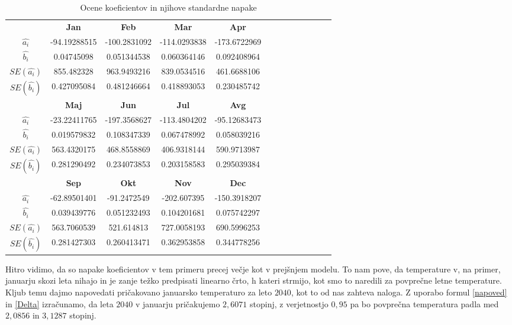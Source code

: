 \documentclass{article}
\begin{document}
\begin{table}[H]
    \centering
    \begin{tabular}{c c c c c c c c c c c c c}
        &	\bf{Jan}  &  \bf{Feb}  &  \bf{Mar}  &  \bf{Apr}   \\
        $\hat{a_i}$       &  -94.19288515  &	-100.2831092  &	-114.0293838  &	-173.6722969   \\
        $\hat{b_i}$       &  0.04745098	&  0.051344538  &	0.060364146  &	0.092408964   \\
        $SE (\hat{a_i})$  &  855.482328  &	963.9493216  &	839.0534516  & 	461.6688106    \\
        $SE (\hat{b_i})$  &  0.427095084  &	0.481246664  & 	0.418893053  &	0.230485742    \\
        &  \bf{Maj}  & \bf{Jun}  &  \bf{Jul}  &  \bf{Avg}   \\
        $\hat{a_i}$       &  -23.22411765  & 	-197.3568627  &  	-113.4804202 &	-95.12683473  \\
        $\hat{b_i}$       &	0.019579832  & 	0.108347339  &	0.067478992  &	0.058039216    \\ 
        $SE (\hat{a_i})$  &	563.4320175  &	468.8558869  &	406.9318144  &	590.9713987   \\
        $SE (\hat{b_i})$  &	0.281290492  &	0.234073853  &	0.203158583  &	0.295039384  \\
        &  \bf{Sep}  &  \bf{Okt}  &  \bf{Nov}  &  \bf{Dec}  \\
        $\hat{a_i}$       &  -62.89501401 &	-91.2472549  &  -202.607395  &	-150.3918207  \\
        $\hat{b_i}$       &	0.039439776  &	0.051232493  &  0.104201681  &	0.075742297  \\
        $SE (\hat{a_i})$  &	563.7060539  &	521.614813   &  727.0058193  &	690.5996253  \\
        $SE (\hat{b_i})$  &	0.281427303  &	0.260413471  &  0.362953858  &	0.344778256  \\
    \end{tabular}
    \caption{Ocene koeficientov in njihove standardne napake}
\end{table}
Hitro vidimo, da so napake koeficientov v tem primeru precej večje kot v prejšnjem modelu. 
To nam pove, da temperature v, na primer, januarju skozi leta nihajo in je zanje težko predpisati 
linearno črto, h kateri strmijo, kot smo to naredili za povprečne letne temperature. Kljub temu dajmo 
napovedati pričakovano januarsko temperaturo za leto $2040$, kot to od nas zahteva naloga.  
Z uporabo formul \ref{napoved} in \ref{Delta} izračunamo, da leta $2040$ v januarju pričakujemo
$2{,}6071$ stopinj, z verjetnostjo $0{,}95$ pa bo povprečna temperatura padla med $2{,}0856$ in 
$3{,}1287$ stopinj.
\end{document}
